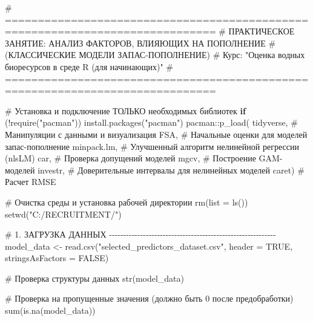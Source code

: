 \documentclass[
  letterpaper,
  DIV=11,
  numbers=noendperiod]{scrreprt}
\newenvironment{Shaded}{\begin{snugshade}}{\end{snugshade}}
\newcommand{\AttributeTok}[1]{\textcolor[rgb]{0.40,0.45,0.13}{#1}}
\newcommand{\CommentTok}[1]{\textcolor[rgb]{0.37,0.37,0.37}{#1}}
\newcommand{\ConstantTok}[1]{\textcolor[rgb]{0.56,0.35,0.01}{#1}}
\newcommand{\ControlFlowTok}[1]{\textcolor[rgb]{0.00,0.23,0.31}{\textbf{#1}}}
\newcommand{\FunctionTok}[1]{\textcolor[rgb]{0.28,0.35,0.67}{#1}}
\newcommand{\NormalTok}[1]{\textcolor[rgb]{0.00,0.23,0.31}{#1}}
\newcommand{\OtherTok}[1]{\textcolor[rgb]{0.00,0.23,0.31}{#1}}
\newcommand{\SpecialCharTok}[1]{\textcolor[rgb]{0.37,0.37,0.37}{#1}}
\newcommand{\StringTok}[1]{\textcolor[rgb]{0.13,0.47,0.30}{#1}}
\begin{document}
\begin{Shaded}
\begin{Highlighting}[]
\CommentTok{\# ==============================================================================}
\CommentTok{\# ПРАКТИЧЕСКОЕ ЗАНЯТИЕ: АНАЛИЗ ФАКТОРОВ, ВЛИЯЮЩИХ НА ПОПОЛНЕНИЕ }
\CommentTok{\# (КЛАССИЧЕСКИЕ МОДЕЛИ ЗАПАС{-}ПОПОЛНЕНИЕ)}
\CommentTok{\# Курс: "Оценка водных биоресурсов в среде R (для начинающих)"}
\CommentTok{\# ==============================================================================}

\CommentTok{\# Установка и подключение ТОЛЬКО необходимых библиотек}
\ControlFlowTok{if}\NormalTok{ (}\SpecialCharTok{!}\FunctionTok{require}\NormalTok{(}\StringTok{"pacman"}\NormalTok{)) }\FunctionTok{install.packages}\NormalTok{(}\StringTok{"pacman"}\NormalTok{)}
\NormalTok{pacman}\SpecialCharTok{::}\FunctionTok{p\_load}\NormalTok{(}
\NormalTok{  tidyverse,    }\CommentTok{\# Манипуляции с данными и визуализация}
\NormalTok{  FSA,          }\CommentTok{\# Начальные оценки для моделей запас{-}пополнение}
\NormalTok{  minpack.lm,   }\CommentTok{\# Улучшенный алгоритм нелинейной регрессии (nlsLM)}
\NormalTok{  car,          }\CommentTok{\# Проверка допущений моделей}
\NormalTok{  mgcv,         }\CommentTok{\# Построение GAM{-}моделей}
\NormalTok{  investr,      }\CommentTok{\# Доверительные интервалы для нелинейных моделей}
\NormalTok{   caret)       }\CommentTok{\# Расчет RMSE}

\CommentTok{\# Очистка среды и установка рабочей директории}
\FunctionTok{rm}\NormalTok{(}\AttributeTok{list =} \FunctionTok{ls}\NormalTok{())}
\FunctionTok{setwd}\NormalTok{(}\StringTok{"C:/RECRUITMENT/"}\NormalTok{)}

\CommentTok{\# 1. ЗАГРУЗКА ДАННЫХ {-}{-}{-}{-}{-}{-}{-}{-}{-}{-}{-}{-}{-}{-}{-}{-}{-}{-}{-}{-}{-}{-}{-}{-}{-}{-}{-}{-}{-}{-}{-}{-}{-}{-}{-}{-}{-}{-}{-}{-}{-}{-}{-}{-}{-}{-}{-}{-}{-}{-}{-}{-}{-}{-}{-}{-}{-}{-}{-}}
\NormalTok{model\_data }\OtherTok{\textless{}{-}} \FunctionTok{read.csv}\NormalTok{(}\StringTok{"selected\_predictors\_dataset.csv"}\NormalTok{, }
                      \AttributeTok{header =} \ConstantTok{TRUE}\NormalTok{, }
                      \AttributeTok{stringsAsFactors =} \ConstantTok{FALSE}\NormalTok{)}

\CommentTok{\# Проверка структуры данных}
\FunctionTok{str}\NormalTok{(model\_data)}

\CommentTok{\# Проверка на пропущенные значения (должно быть 0 после предобработки)}
\FunctionTok{sum}\NormalTok{(}\FunctionTok{is.na}\NormalTok{(model\_data))}


\end{Highlighting}
\end{Shaded}
\end{document}
